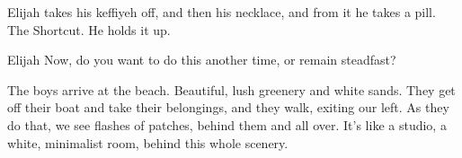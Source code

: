 \documentclass{screenplay}
\begin{document}

Elijah takes his keffiyeh off, and then his necklace, and from it he takes a pill. The Shortcut. He holds it up.

\begin{dialogue}{Elijah}
    Now, do you want to do this another time, or remain steadfast?
\end{dialogue}


The boys arrive at the beach. Beautiful, lush greenery and white sands. They get off their boat and take their belongings, and they walk, exiting our left. As they do that, we see flashes of patches, behind them and all over. It's like a studio, a white, minimalist room, behind this whole scenery.

\theend
\end{document}
